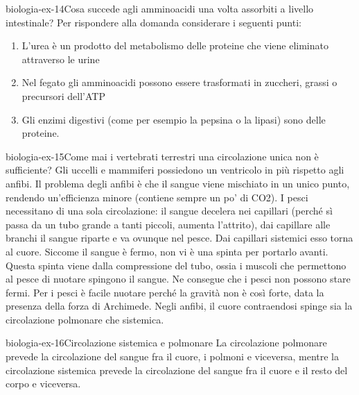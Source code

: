 \documentclass[preview]{standalone}
\begin{document}
\begin{snippetexercise}{biologia-ex-14}{Cosa succede agli amminoacidi una volta assorbiti a
    livello intestinale? Per rispondere alla domanda
    considerare i seguenti punti:}
    \begin{enumerate}
        \item L'urea è un prodotto del metabolismo delle proteine che
            viene eliminato attraverso le urine
        \item Nel fegato gli amminoacidi possono essere trasformati in
        zuccheri, grassi o precursori dell'ATP
        \item Gli enzimi digestivi (come per esempio la pepsina o la
        lipasi) sono delle proteine.
    \end{enumerate}

\end{snippetexercise}

\begin{snippetexercise}{biologia-ex-15}{Come mai i vertebrati terrestri una circolazione unica non è sufficiente?}
    Gli uccelli e mammiferi possiedono un ventricolo in più rispetto agli anfibi.
    Il problema degli anfibi è che il sangue viene mischiato in un unico punto, rendendo un'efficienza minore (contiene sempre un po' di CO2).
    I pesci necessitano di una sola circolazione: il sangue decelera nei capillari (perché sì passa da un tubo grande a tanti piccoli, aumenta l'attrito),
    dai capillare alle branchi il sangue riparte e va ovunque nel pesce. Dai capillari sistemici esso torna al cuore.
    Siccome il sangue è fermo, non vi è una spinta per portarlo avanti.
    Questa spinta viene dalla compressione del tubo, ossia i muscoli che permettono al pesce di nuotare
    spingono il sangue. Ne consegue che i pesci non possono stare fermi.
    Per i pesci è facile nuotare perché la gravità non è così forte, data la presenza della forza di Archimede.
    Negli anfibi, il cuore contraendosi spinge sia la circolazione polmonare che sistemica.
\end{snippetexercise}

\begin{snippetexercise}{biologia-ex-16}{Circolazione sistemica e polmonare}
    La circolazione polmonare prevede la circolazione del sangue fra il cuore, i polmoni e viceversa,
    mentre la circolazione sistemica prevede la circolazione del sangue fra il cuore e il resto del corpo e viceversa.
\end{snippetexercise}
\end{document}
